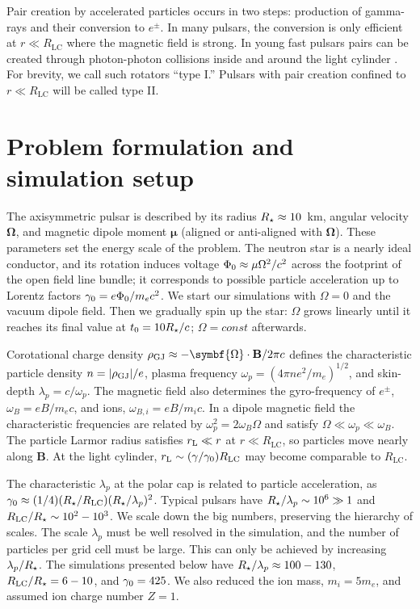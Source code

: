 Pair creation by accelerated particles occurs in two steps: production of gamma-rays
and their conversion to $e^\pm$. In many pulsars, the conversion is only efficient
at $r\ll R_\mathrm{LC}$ where the magnetic field is strong. In young fast pulsars pairs can
be created through photon-photon collisions inside and around
the light cylinder
\citep{cheng_energetic_1986}.
For brevity, we call such rotators
``type I.'' Pulsars with pair creation confined to $r\ll R_\mathrm{LC}$ will be called type II.


\section{Problem formulation and simulation setup}


The axisymmetric pulsar is described by its radius $R_{\star}\approx 10$~km,
angular velocity $\symbf{\Omega}$, and magnetic dipole moment $\symbf{\mu}$ (aligned or
anti-aligned with $\symbf{\Omega}$).  These parameters set the energy scale of
the problem. The neutron star is a nearly ideal conductor, and its
rotation induces voltage $\Phi_0\approx \mu\Omega^2/c^2$ across the
footprint of the open field line bundle;
it corresponds to possible particle acceleration up to Lorentz factors
$\gamma_0=e\Phi_0/m_ec^2$.
We start our simulations with $\Omega=0$ and the vacuum dipole field.
Then we gradually spin up the star: $\Omega$ grows linearly until
it reaches its final value at $t_0=10 R_{\star}/c$;
$\Omega=const$ afterwards.

Corotational charge density
$\rho_{\rm GJ}\approx -\symbf{\Omega}\cdot \mathbf{B}/2\pi c$
defines the characteristic particle density $n=|\rho_{\rm GJ}|/e$, plasma
frequency $\omega_p=(4\pi ne^2/m_e)^{1/2}$, and skin-depth
$\lambda_p=c/\omega_p$.  The magnetic field also determines the
gyro-frequency of $e^\pm$, $\omega_B=eB/m_ec$, and ions,
$\omega_{B,i}=eB/m_ic$. In a dipole magnetic field
the characteristic frequencies
are related by $\omega_p^2=2\omega_B\Omega$ and satisfy
$\Omega\ll\omega_p\ll\omega_B$.
The particle Larmor radius satisfies
$r_{\rm L}\ll r$ at $r\ll R_\mathrm{LC}$, so particles move nearly along $\mathbf{B}$. At the light cylinder,
$r_{\rm L}\sim(\gamma/\gamma_0)R_\mathrm{LC}$ may become comparable to $R_\mathrm{LC}$.

The characteristic $\lambda_p$ at the polar cap is related to particle
acceleration, as $\gamma_0\approx (1/4)(R_{\star}/R_\mathrm{LC})(R_{\star}/\lambda_p)^2$.
Typical pulsars have $R_{\star}/\lambda_p\sim 10^6\gg 1$ and $R_\mathrm{LC}/R_{\star}\sim
10^2-10^3$.  We scale down the big numbers, preserving the hierarchy
of scales. The scale $\lambda_p$ must be well resolved in the
simulation, and the number of particles per grid cell must be large.
This can only be achieved by increasing $\lambda_p/R_{\star}$.
The simulations presented below have
$R_{\star}/\lambda_p\approx 100-130$, $R_\mathrm{LC}/R_{\star}=6-10$, and  $\gamma_0=425$.
We also reduced the ion mass, $m_i=5m_e$,
and assumed ion charge number $Z=1$.

